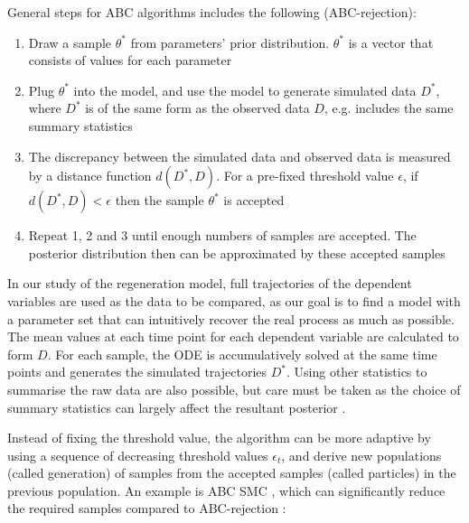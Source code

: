 General steps for ABC algorithms includes the following (ABC-rejection):

\begin{enumerate}
    \item Draw a sample $\theta^*$ from parameters' prior distribution. $\theta^*$ is a vector that consists of values for each parameter
    \item Plug $\theta^*$ into the model, and use the model to generate simulated data $D^*$, where $D^*$ is of the same form as the observed data $D$, e.g. includes the same summary statistics
    \item The discrepancy between the simulated data and observed data is measured by a distance function $d(D^*, D)$. For a pre-fixed threshold value $\epsilon$, if $d(D^*, D)<\epsilon$ then the sample $\theta^*$ is accepted
    \item Repeat 1, 2 and 3 until enough numbers of samples are accepted. The posterior distribution then can be approximated by these accepted samples
\end{enumerate}

In our study of the regeneration model, full trajectories of the dependent variables are used as the data to be compared, as our goal is to find a model with a parameter set that can intuitively recover the real process as much as possible. The mean values at each time point for each dependent variable are calculated to form $D$. For each sample, the ODE is accumulatively solved at the same time points and generates the simulated trajectories $D^*$. Using other statistics to summarise the raw data are also possible, but care must be taken as the choice of summary statistics can largely affect the resultant posterior \cite{summaryD, summaryD2}.

Instead of fixing the threshold value, the algorithm can be more adaptive by using a sequence of decreasing threshold values $\epsilon_t$, and derive new populations (called generation) of samples from the accepted samples (called particles) in the previous population. An example is ABC SMC \cite{Toni}, which can significantly reduce the required samples compared to ABC-rejection \cite{ref:disease}:

